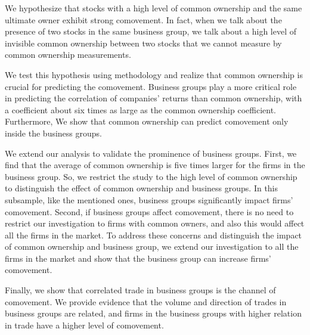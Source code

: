 We hypothesize that stocks with a high level of common ownership and the same ultimate owner exhibit strong comovement. In fact, when we talk about the presence of two stocks in the same business group, we talk about a high level of invisible common ownership between two stocks that we cannot measure by common ownership measurements. 

We test this hypothesis using \cite{AntonPolk} methodology and realize that common ownership is crucial for predicting the comovement. Business groups play a more critical role in predicting the correlation of companies' returns than common ownership, with a coefficient about six times as large as the common ownership coefficient. Furthermore, We show that common ownership can predict comovement only inside the business groups.



We extend our analysis to validate the prominence of business groups. First, we find that the average of common ownership is five times larger for the firms in the business group. So, we restrict the study to the high level of common ownership to distinguish the effect of common ownership and business groups. In this subsample, like the mentioned ones, business groups significantly impact firms' comovement. Second, if business groups affect comovement, there is no need to restrict our investigation to firms with common owners, and also this would affect all the firms in the market. To address these concerns and distinguish the impact of common ownership and business group, we extend our investigation to all the firms in the market and show that the business group can increase firms' comovement. 
	
	Finally, we show that correlated trade in business groups is the channel of comovement. We provide evidence that the volume and direction of trades in business groups are related, and firms in the business groups with higher relation in trade have a higher level of comovement.
	
	
	

%